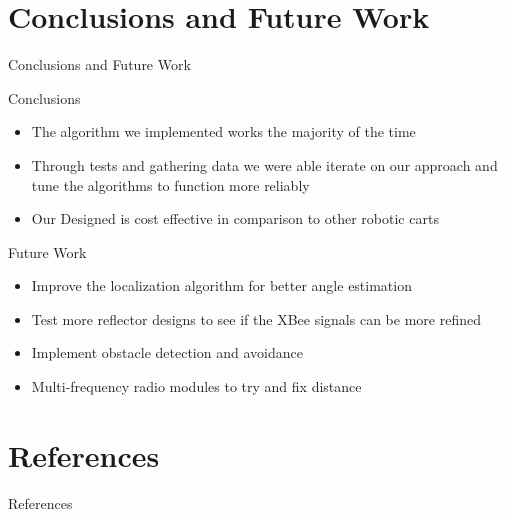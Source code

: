 \documentclass{beamer}
\begin{document}

\section{Conclusions and Future Work}

\begin{frame}{Conclusions and Future Work}
  \begin{block}{Conclusions}
    \begin{itemize}
      \item The algorithm we implemented works the majority of the time
      \item Through tests and gathering data we were able iterate on our approach and tune the algorithms to function more reliably
      \item Our Designed is cost effective in comparison to other robotic carts
    \end{itemize}
  \end{block}
  \begin{block}{Future Work}
    \begin{itemize}
      \item Improve the localization algorithm for better angle estimation
      \item Test more reflector designs to see if the XBee signals can be more refined
      \item Implement obstacle detection and avoidance
      \item Multi-frequency radio modules to try and fix distance
    \end{itemize}
  \end{block}
\end{frame}


\section{References}

\begin{frame}{References}
  
  
\end{frame}

\end{document}
